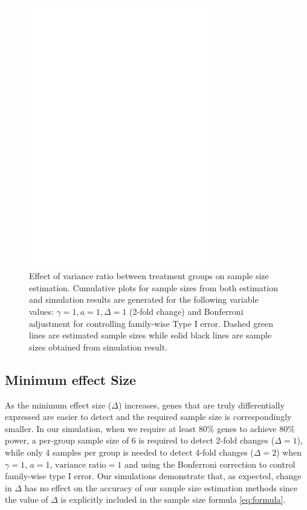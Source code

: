 \documentclass{bioinfo}
\begin{document}
\begin{figure}[h]
  \centerline{\includegraphics*[width=3.2in]{ResVarF.pdf}}
  \caption[Effect of variance ratio between treatment groups on
  sample size estimation] {Effect of variance ratio between
  treatment groups on sample size estimation.  Cumulative plots for
  sample sizes from both estimation and simulation results are
  generated for the following variable values: $\gamma = 1, a = 1,
  \Delta = 1$ (2-fold change) and Bonferroni adjustment for
  controlling family-wise Type I error. Dashed green lines are
  estimated sample sizes while solid black lines are sample
  sizes obtained from simulation result.}  \label{fig:ResVar}
\end{figure}

\subsection{Minimum effect Size}

As the minimum effect size ($\Delta$) increases, genes that are
truly differentially expressed are easier to detect and the
required sample size is correspondingly smaller.  In our
simulation, when we require at least 80\% genes to achieve 80\%
power, a per-group sample size of 6 is required to detect 2-fold
changes ($\Delta = 1$), while only 4 samples per group is needed
to detect 4-fold changes ($\Delta = 2$) when $\gamma=1$, $a=1$,
$\text{variance ratio}=1$ and using the Bonferroni correction to
control family-wise type I error. Our simulations demonstrate
that, as expected, change in $\Delta$ has no effect on the
accuracy of our sample size estimation methods since the value of
$\Delta$ is explicitly included in the sample size formula
\ref{eq:formula}.
\end{document}
